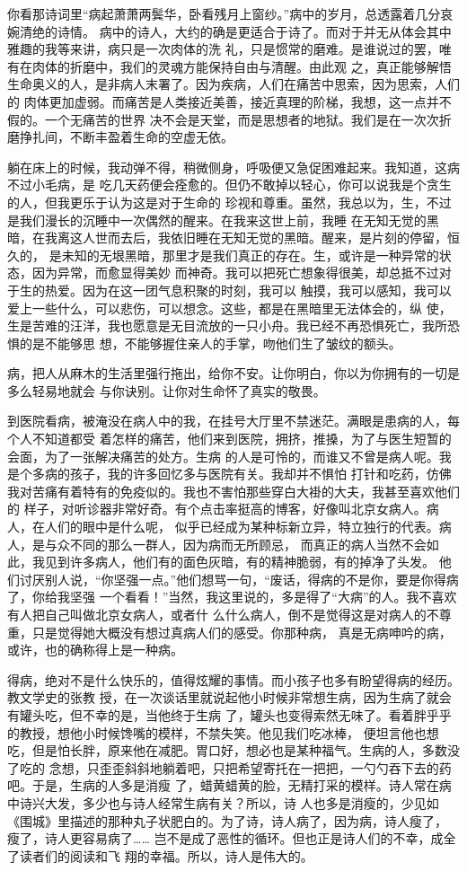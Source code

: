 		你看那诗词里“病起萧萧两鬓华，卧看残月上窗纱。”病中的岁月，总透露着几分哀婉清绝的诗情。
	病中的诗人，大约的确是更适合于诗了。而对于并无从体会其中雅趣的我等来讲，病只是一次肉体的洗
	礼，只是惯常的磨难。是谁说过的罢，唯有在肉体的折磨中，我们的灵魂方能保持自由与清醒。由此观
	之，真正能够解悟生命奥义的人，是非病人末署了。因为疾病，人们在痛苦中思索，因为思索，人们的
	肉体更加虚弱。而痛苦是人类接近美善，接近真理的阶梯，我想，这一点并不假的。一个无痛苦的世界
	决不会是天堂，而是思想者的地狱。我们是在一次次折磨挣扎间，不断丰盈着生命的空虚无依。


		躺在床上的时候，我动弹不得，稍微侧身，呼吸便又急促困难起来。我知道，这病不过小毛病，是
	吃几天药便会痊愈的。但仍不敢掉以轻心，你可以说我是个贪生的人，但我更乐于认为这是对于生命的
	珍视和尊重。虽然，我总以为，生，不过是我们漫长的沉睡中一次偶然的醒来。在我来这世上前，我睡
	在无知无觉的黑暗，在我离这人世而去后，我依旧睡在无知无觉的黑暗。醒来，是片刻的停留，恒久的，
	是未知的无垠黑暗，那里才是我们真正的存在。生，或许是一种异常的状态，因为异常，而愈显得美妙
	而神奇。我可以把死亡想象得很美，却总抵不过对于生的热爱。因为在这一团气息积聚的时刻，我可以
	触摸，我可以感知，我可以爱上一些什么，可以悲伤，可以想念。这些，都是在黑暗里无法体会的，纵
	使，生是苦难的汪洋，我也愿意是无目流放的一只小舟。我已经不再恐惧死亡，我所恐惧的是不能够思
	想，不能够握住亲人的手掌，吻他们生了皱纹的额头。


		病，把人从麻木的生活里强行拖出，给你不安。让你明白，你以为你拥有的一切是多么轻易地就会
	与你诀别。让你对生命怀了真实的敬畏。

		到医院看病，被淹没在病人中的我，在挂号大厅里不禁迷茫。满眼是患病的人，每个人不知道都受
	着怎样的痛苦，他们来到医院，拥挤，推搡，为了与医生短暂的会面，为了一张解决痛苦的处方。生病
	的人是可怜的，而谁又不曾是病人呢。我是个多病的孩子，我的许多回忆多与医院有关。我却并不惧怕
	打针和吃药，仿佛我对苦痛有着特有的免疫似的。我也不害怕那些穿白大褂的大夫，我甚至喜欢他们的
	样子，对听诊器非常好奇。有个点击率挺高的博客，好像叫北京女病人。病人，在人们的眼中是什么呢，
	似乎已经成为某种标新立异，特立独行的代表。病人，是与众不同的那么一群人，因为病而无所顾忌，
	而真正的病人当然不会如此，我见到许多病人，他们有的面色灰暗，有的精神脆弱，有的掉净了头发。
	他们讨厌别人说，“你坚强一点。”他们想骂一句，“废话，得病的不是你，要是你得病了，你给我坚强
	一个看看！”当然，我这里说的，多是得了“大病”的人。我不喜欢有人把自己叫做北京女病人，或者什
	么什么病人，倒不是觉得这是对病人的不尊重，只是觉得她大概没有想过真病人们的感受。你那种病，
	真是无病呻吟的病，或许，也的确称得上是一种病。


		得病，绝对不是什么快乐的，值得炫耀的事情。而小孩子也多有盼望得病的经历。教文学史的张教
	授，在一次谈话里就说起他小时候非常想生病，因为生病了就会有罐头吃，但不幸的是，当他终于生病
	了，罐头也变得索然无味了。看着胖乎乎的教授，想他小时候馋嘴的模样，不禁失笑。他见我们吃冰棒，
	便坦言他也想吃，但是怕长胖，原来他在减肥。胃口好，想必也是某种福气。生病的人，多数没了吃的
	念想，只歪歪斜斜地躺着吧，只把希望寄托在一把把，一勺勺吞下去的药吧。于是，生病的人多是消瘦
	了，蜡黄蜡黄的脸，无精打采的模样。诗人常在病中诗兴大发，多少也与诗人经常生病有关？所以，诗
	人也多是消瘦的，少见如《围城》里描述的那种丸子状肥白的。为了诗，诗人病了，因为病，诗人瘦了，
	瘦了，诗人更容易病了…… 岂不是成了恶性的循环。但也正是诗人们的不幸，成全了读者们的阅读和飞
	翔的幸福。所以，诗人是伟大的。


